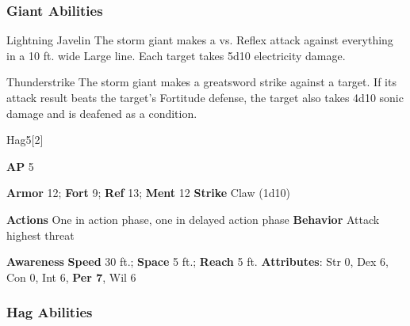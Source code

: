 \subsubsection{Giant Abilities}

\begin{ability}{Lightning Javelin}
The storm giant makes a  vs. Reflex attack against everything in a 10 ft. wide Large line.
\hit Each target takes 5d10 electricity damage.
\end{ability}

\vspace{0.5em}
\begin{ability}{Thunderstrike}
The storm giant makes a greatsword strike against a target.
If its attack result beats the target's Fortitude defense,
the target also takes 4d10 sonic damage
and is deafened as a condition.
\end{ability}






\begin{monsection}[Green]{Hag}{5}[2]
\vspace{-1em}\vspace{-1em}
\begin{spellcontent}
\begin{spelltargetinginfo}
{\textbf{AP} 5}

\pari \textbf{Armor} 12;
\textbf{Fort} 9;
\textbf{Ref} 13;
\textbf{Ment} 12
\pari \textbf{Strike} Claw  (1d10)


\pari \textbf{Actions} One in action phase, one in delayed action phase
\pari \textbf{Behavior} Attack highest threat
\end{spelltargetinginfo}
\end{spellcontent}

\begin{monsterfooter}
\pari \textbf{Awareness} 
\pari \textbf{Speed} 30 ft.;
\textbf{Space} 5 ft.;
\textbf{Reach} 5 ft.
\pari \textbf{Attributes}:
Str 0,
Dex 6,
Con 0,
Int 6,
\textbf{Per 7},
Wil 6
\end{monsterfooter}
\end{monsection}


\subsubsection{Hag Abilities}

